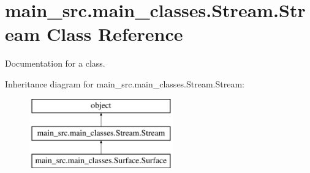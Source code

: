 \hypertarget{classmain__src_1_1main__classes_1_1Stream_1_1Stream}{\section{main\-\_\-src.\-main\-\_\-classes.\-Stream.\-Stream Class Reference}
\label{classmain__src_1_1main__classes_1_1Stream_1_1Stream}
}


Documentation for a class.  


Inheritance diagram for main\-\_\-src.\-main\-\_\-classes.\-Stream.\-Stream\-:\begin{figure}[H]
\begin{center}
\leavevmode
\includegraphics[height=3.000000cm]{classmain__src_1_1main__classes_1_1Stream_1_1Stream}
\end{center}
\end{figure}

